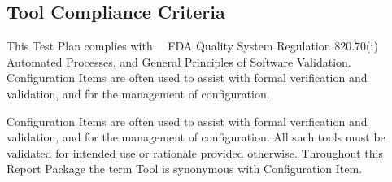 \subsection{Tool Compliance Criteria}
This Test Plan complies with \sopSDLC\, \sopSCM\, FDA Quality System Regulation
820.70(i) Automated Processes, and General Principles of Software Validation.
Configuration Items are often used to assist with formal verification and
validation, and for the management of configuration.

Configuration Items are often used to assist with formal verification and
validation, and for the management of configuration.  All such tools must be
validated for intended use or rationale provided otherwise.  Throughout this
Report Package the term Tool is synonymous with Configuration Item.
